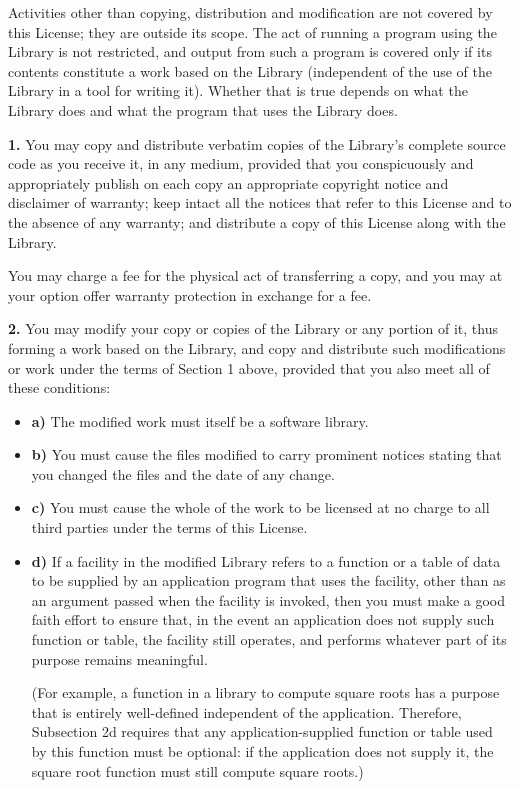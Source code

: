 {{{Activities other than copying, distribution and modification are not covered
by this License; they are outside its scope. The act of running a program
using the Library is not restricted, and output from such a program is covered
only if its contents constitute a work based on the Library (independent of
the use of the Library in a tool for writing it). Whether that is true depends
on what the Library does and what the program that uses the Library does. 

{\bf 1.} You may copy and distribute verbatim copies of the Library's complete
source code as you receive it, in any medium, provided that you conspicuously
and appropriately publish on each copy an appropriate copyright notice and
disclaimer of warranty; keep intact all the notices that refer to this License
and to the absence of any warranty; and distribute a copy of this License
along with the Library. 

You may charge a fee for the physical act of transferring a copy, and you may
at your option offer warranty protection in exchange for a fee. 

{\bf 2.} You may modify your copy or copies of the Library or any portion of
it, thus forming a work based on the Library, and copy and distribute such
modifications or work under the terms of Section 1 above, provided that you
also meet all of these conditions: 

\begin{itemize}
\item {\bf a)}  The modified work must itself be a software library.  
\item {\bf b)}  You must cause the files modified to carry prominent notices 
   stating that you changed the files and the date of any change.  
\item {\bf c)}  You must cause the whole of the work to be licensed at no 
   charge to all third parties under the terms of this License.  
\item {\bf d)}  If a facility in the modified Library refers to a function or
   a  table of data to be supplied by an application program that uses  the
   facility, other than as an argument passed when the facility  is invoked, then
you must make a good faith effort to ensure that,  in the event an application
does not supply such function or  table, the facility still operates, and
performs whatever part of  its purpose remains meaningful.  

(For example, a function in a library to compute square roots has  a purpose
that is entirely well-defined independent of the  application. Therefore,
Subsection 2d requires that any  application-supplied function or table used
by this function must  be optional: if the application does not supply it, the
square  root function must still compute square roots.)  


\end{itemize}}}}

